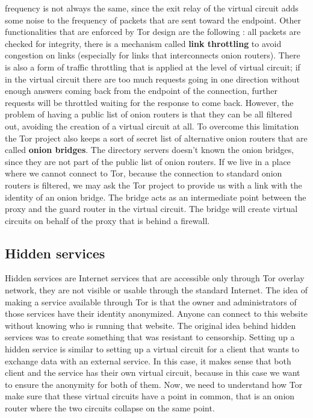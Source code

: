 frequency is not always the same, since the exit relay of the virtual circuit adds some noise to the frequency of packets that are sent toward the endpoint. Other functionalities that are enforced by Tor design are the following : all packets are checked for integrity, there is a mechanism called \textbf{link throttling} to avoid congestion on links (especially for links that interconnects onion routers). There is also a form of traffic throttling that is applied at the level of virtual circuit; if in the virtual circuit there are too much requests going in one direction without enough answers coming back from the endpoint of the connection, further requests will be throttled waiting for the response to come back. However, the problem of having a public list of onion routers is that they can be all filtered out, avoiding the creation of a virtual circuit at all. To overcome this limitation the Tor project also keeps a sort of secret list of alternative onion routers that are called \textbf{onion bridges}. The directory servers doesn't known the onion bridges, since they are not part of the public list of onion routers. If we live in a place where we cannot connect to Tor, because the connection to standard onion routers is filtered, we may ask the Tor project to provide us with a link with the identity of an onion bridge. The bridge acts as an intermediate point between the proxy and the guard router in the virtual circuit. The bridge will create virtual circuits on behalf of the proxy that is behind a firewall.

\subsection{Hidden services}
Hidden services are Internet services that are accessible only through Tor overlay network, they are not visible or usable through the standard Internet. The idea of making a service available through Tor is that the owner and administrators of those services have their identity anonymized. Anyone can connect to this website without knowing who is running that website. The original idea behind hidden services was to create something that was resistant to censorship. Setting up a hidden service is similar to setting up a virtual circuit for a client that wants to exchange data with an external service. In this case, it makes sense that both client and the service has their own virtual circuit, because in this case we want to ensure the anonymity for both of them. Now, we need to understand how Tor make sure that these virtual circuits have a point in common, that is an onion router where the two circuits collapse on the same point. 

